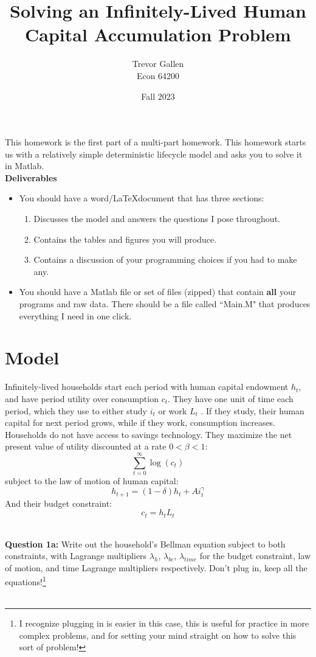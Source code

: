 \documentclass[11pt]{article}
\title{Solving an Infinitely-Lived Human Capital Accumulation Problem}
\author{ Trevor Gallen \\ Econ 64200 }
\date{Fall 2023}
\begin{document}


\maketitle

This homework is the first part of a multi-part homework.  This homework starts us with a relatively simple deterministic lifecycle model and asks you to solve it in Matlab.\\

\textbf{Deliverables}
\begin{itemize}
\item You should have a word/\LaTeX document that has three sections: 
\begin{enumerate}
\item Discusses the model and answers the questions I pose throughout.
\item Contains the tables and figures you will produce.
\item Contains a discussion of your programming choices if you had to make any.
\end{enumerate}
\item You should have a Matlab file or set of files (zipped) that contain \textbf{all} your programs and raw data.  There should be a file called ``Main.M" that produces everything I need in one click.
\end{itemize}


\section{Model}
Infinitely-lived households start each period with human capital endowment $h_t$, and have period utility over consumption $c_t$.  They have one unit of time each period, which they use to either study $i_t$ or work $L_t$ . If they study, their human capital for next period grows, while if they work, consumption increases.  Households do not have access to savings technology.  They maximize the net present value of utility discounted at a rate $0<\beta<1$:
$$\sum_{t=0}^\infty \log(c_t)$$
subject to the law of motion of human capital:
$$h_{t+1}=(1-\delta)h_t+Ai_t^\gamma$$
And their budget constraint:
$$c_t=h_tL_t$$

\ \\
\textbf{Question 1a:} Write out the household's Bellman equation subject to both constraints, with Lagrange multipliers $\lambda_{h}$,  $\lambda_{bc}$, $\lambda_{time}$ for the budget constraint, law of motion, and time Lagrange multipliers respectively. Don't plug in, keep all the equations!\footnote{I recognize plugging in is easier in this case, this is useful for practice in more complex problems, and for setting your mind straight on how to solve this sort of problem!}\\
\ \\
\end{document}
